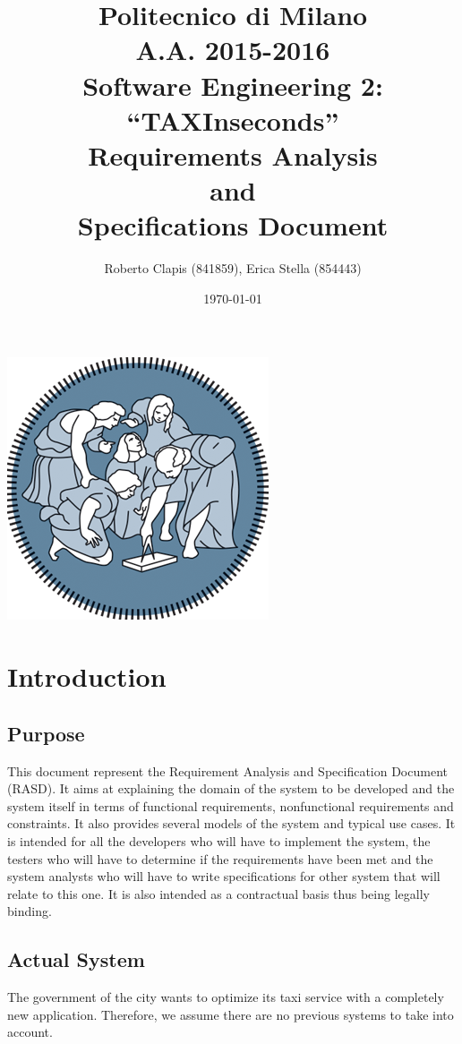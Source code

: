 \documentclass{article}
\author{Roberto Clapis (841859), Erica Stella (854443)}
\date{\today}
\title{Politecnico di Milano
	\\A.A. 2015\@-\@2016
	\\Software Engineering 2: ``TAXInseconds''
	\\\textbf{R}equirements \textbf{A}nalysis \\and\\ \textbf{S}pecifications \textbf{D}ocument}
\begin{document}
\maketitle
\includegraphics{polimi-logo}
\clearpage
\tableofcontents
\clearpage

\section{Introduction}

\subsection{Purpose}
This document represent the Requirement Analysis and Specification Document (RASD). It aims at explaining the domain of the system to be developed and the system itself in terms of functional requirements, nonfunctional requirements and constraints. It also provides several models of the system and typical use cases. It is intended for all the developers who will have to implement the system, the testers who will have to determine if the requirements have been met and the system analysts who will have to write specifications for other system that will relate to this one. It is also intended as a contractual basis thus being legally binding.

\subsection{Actual System}
The government of the city wants to optimize its taxi service with a completely new application. Therefore, we assume there are no previous systems to take into account.
\end{document}

